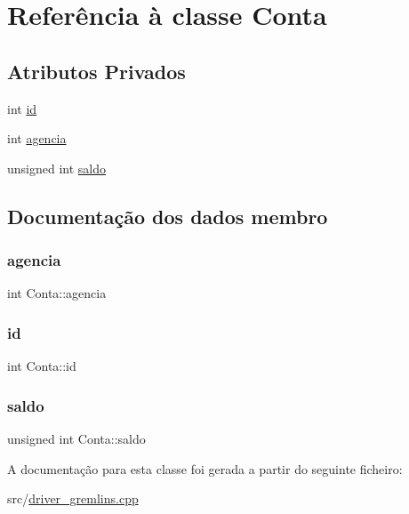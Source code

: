 \hypertarget{classConta}{}\section{Referência à classe Conta}
\label{classConta}
\subsection*{Atributos Privados}
\begin{DoxyCompactItemize}
\item 
int \hyperlink{classConta_a68f8606e5da3fa92ca000a20cdd9736f}{id}
\item 
int \hyperlink{classConta_a4959eba7497d45917d27b8a788c8ca20}{agencia}
\item 
unsigned int \hyperlink{classConta_a717e79a96fb8aa27572707ff1377ca86}{saldo}
\end{DoxyCompactItemize}


\subsection{Documentação dos dados membro}
\mbox{\label{classConta_a4959eba7497d45917d27b8a788c8ca20}} 
\subsubsection{\texorpdfstring{agencia}{agencia}}
{\footnotesize\ttfamily int Conta\+::agencia\hspace{0.3cm}{\ttfamily [private]}}

\mbox{\label{classConta_a68f8606e5da3fa92ca000a20cdd9736f}} 
\subsubsection{\texorpdfstring{id}{id}}
{\footnotesize\ttfamily int Conta\+::id\hspace{0.3cm}{\ttfamily [private]}}

\mbox{\label{classConta_a717e79a96fb8aa27572707ff1377ca86}} 
\subsubsection{\texorpdfstring{saldo}{saldo}}
{\footnotesize\ttfamily unsigned int Conta\+::saldo\hspace{0.3cm}{\ttfamily [private]}}



A documentação para esta classe foi gerada a partir do seguinte ficheiro\+:\begin{DoxyCompactItemize}
\item 
src/\hyperlink{driver__gremlins_8cpp}{driver\+\_\+gremlins.\+cpp}\end{DoxyCompactItemize}
